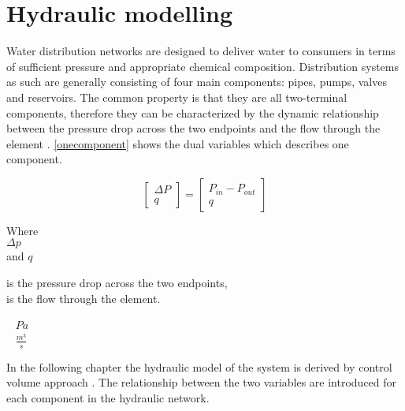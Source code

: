 \section{Hydraulic modelling}
\label{HydraulicModel}


Water distribution networks are designed to deliver water to consumers in terms of sufficient pressure and appropriate chemical composition. Distribution systems as such are generally consisting of four main components: pipes, pumps, valves and reservoirs. The common property is that they are all two-terminal components, therefore they can be characterized by the dynamic relationship between the pressure drop across the two endpoints and the flow through the element \cite{Kallesoe2009}.  \eqref{onecomponent} shows the dual variables which describes one component. 

\begin{equation}
\label{onecomponent}
 \begin{bmatrix}
    \Delta P \\
    q
\end{bmatrix}
=
 \begin{bmatrix}
    P_{in} - P_{out} \\
    q
\end{bmatrix}
\end{equation}

 \begin{minipage}[t]{0.20\textwidth}
Where\\
\hspace*{8mm} $\Delta p$ \\
and \hspace*{0.7mm} $q$ 
\end{minipage}
\begin{minipage}[t]{0.68\textwidth}
\vspace*{2mm}
is the pressure drop across the two endpoints,\\
is the flow through the element.
\end{minipage}
\begin{minipage}[t]{0.10\textwidth}
\vspace*{2mm}
\textcolor{White}{te}$\unit{Pa}$\\
\textcolor{White}{te}$\unit{\frac{m^{3}}{s}}$
\end{minipage}

In the following chapter the hydraulic model of the system is derived by control volume approach \cite{Hunt_Fluidmechanics}. The relationship between the two variables are introduced for each component in the hydraulic network.

